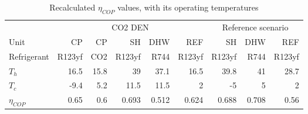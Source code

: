 \begin{table}[htp]
\centering
\caption{Recalculated $\eta_{COP}$ values, with its operating temperatures}\vspace{2mm}
\label{tab:eta_COP_new} 
\begin{tabular}{lrrrrrrrr} \toprule
	& \multicolumn{5}{c}{CO2 DEN} & \multicolumn{3}{c}{Reference scenario} \\
	Unit & CP & CP & SH & DHW & REF & SH & DHW & REF \\ \midrule
	Refrigerant & R123yf & CO2 & R123yf & R744 & R123yf & R123yf & R744 & R123yf \\
$	T_{h}$ & 16.5 & 15.8 & 39 & 37.1 & 16.5 & 39.8 & 41 & 28.7 \\
$	T_{c} $& -9.4 & 5.2 & 11.5 & 11.5 & 2 & -5 & 5 & 2 \\
	$\eta_{COP}$ & 0.65 & 0.6 & 0.693 & 0.512 & 0.624 & 0.688 & 0.708 & 0.56 \\ \bottomrule
\end{tabular}
\end{table}